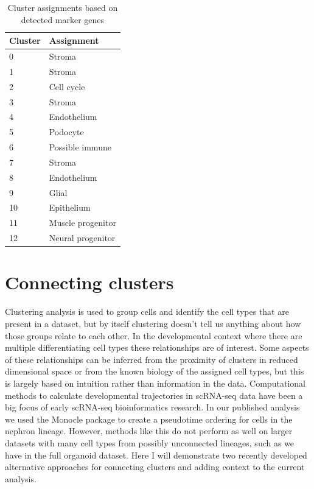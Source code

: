 \documentclass[11pt,a4paper,titlepage,twoside,openright]{style/unimelbthesis}
\theoremstyle{definition}
\theoremstyle{definition}
\theoremstyle{definition}
\theoremstyle{remark}
\begin{document}
\begin{mainmatter}
\begin{table}

\caption{\label{tab:assignments}Cluster assignments based on detected marker genes}
\centering
\begin{tabular}[t]{ll}
\toprule
Cluster & Assignment\\
\midrule
0 & Stroma\\
1 & Stroma\\
2 & Cell cycle\\
3 & Stroma\\
4 & Endothelium\\
5 & Podocyte\\
6 & Possible immune\\
7 & Stroma\\
8 & Endothelium\\
9 & Glial\\
10 & Epithelium\\
11 & Muscle progenitor\\
12 & Neural progenitor\\
\bottomrule
\end{tabular}
\end{table}

\hypertarget{connecting-clusters}{%
\section{Connecting clusters}\label{connecting-clusters}}

Clustering analysis is used to group cells and identify the cell types that are present in a dataset, but by itself clustering doesn't tell us anything about how those groups relate to each other. In the developmental context where there are multiple differentiating cell types these relationships are of interest. Some aspects of these relationships can be inferred from the proximity of clusters in reduced dimensional space or from the known biology of the assigned cell types, but this is largely based on intuition rather than information in the data. Computational methods to calculate developmental trajectories in scRNA-seq data have been a big focus of early scRNA-seq bioinformatics research. In our published analysis we used the Monocle package to create a pseudotime ordering for cells in the nephron lineage. However, methods like this do not perform as well on larger datasets with many cell types from possibly unconnected lineages, such as we have in the full organoid dataset. Here I will demonstrate two recently developed alternative approaches for connecting clusters and adding context to the current analysis.


\end{mainmatter}
\end{document}
